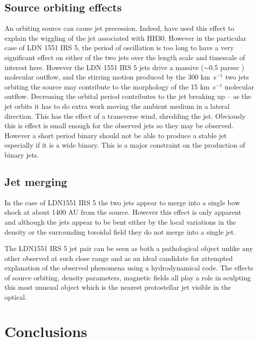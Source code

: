 \subsection{Source orbiting effects}
An orbiting source can cause jet precession.
Indeed, \citet{2002ApJ...568..733M} have used this effect to explain the wiggling of the jet associated with HH30.
However in the particular case of LDN 1551 IRS 5, the period of oscillation is too long to have a very significant
effect on either of the two jets over the length scale and timescale of interest here. 
However the LDN 1551 IRS 5 jets drive a massive ($\sim$0.5 parsec ) molecular outflow, and the stirring motion produced by the 300 km~s$^{-1}$ two jets orbiting the source may contribute to the morphology of the 15 km~s$^{-1}$ molecular outflow.
Decreasing the orbital period contributes to the jet
breaking up -- as the jet orbits it has to do extra work moving the ambient medium in a lateral direction.
This has the effect of a transverse wind, shredding the jet.
Obviously this is effect is small enough for the observed jets so they may be observed.
However a short period binary should not be able to produce a
stable jet especially if it is a wide binary. This is a major constraint on the
production of binary jets.

\subsection{Jet merging}

In the case of LDN1551 IRS 5 the two jets appear to merge into a single bow shock
at about 1400 AU from the source. However this effect is only apparent and
although the jets appear to be bent either by the local variations in the
density or the surrounding toroidal field they do not merge into a single jet.

The LDN1551 IRS 5 jet pair can be seen as both a pathological object unlike any other observed at such close range and as an ideal candidate for attempted explanation of the observed phenomena using a hydrodynamical code. The effects of source orbiting, density parameters, magnetic fields all play a role in sculpting this most unusual object which is the nearest protostellar jet visible in the optical.



\section{Conclusions}

